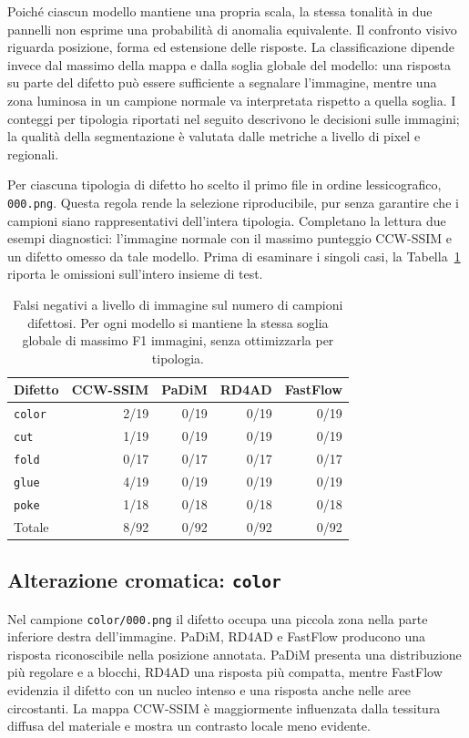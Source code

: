 Poiché ciascun modello mantiene una propria scala, la stessa tonalità in due pannelli non esprime una probabilità di anomalia equivalente. Il confronto visivo riguarda posizione, forma ed estensione delle risposte. La classificazione dipende invece dal massimo della mappa e dalla soglia globale del modello: una risposta su parte del difetto può essere sufficiente a segnalare l'immagine, mentre una zona luminosa in un campione normale va interpretata rispetto a quella soglia. I conteggi per tipologia riportati nel seguito descrivono le decisioni sulle immagini; la qualità della segmentazione è valutata dalle metriche a livello di pixel e regionali.

Per ciascuna tipologia di difetto ho scelto il primo file in ordine lessicografico, \texttt{000.png}. Questa regola rende la selezione riproducibile, pur senza garantire che i campioni siano rappresentativi dell'intera tipologia. Completano la lettura due esempi diagnostici: l'immagine normale con il massimo punteggio CCW-SSIM e un difetto omesso da tale modello. Prima di esaminare i singoli casi, la Tabella~\ref{tab:cap4-fn} riporta le omissioni sull'intero insieme di test.

\begin{table}[htbp]
\centering
\begin{tabular}{lrrrr}
\hline
Difetto & CCW-SSIM & PaDiM & RD4AD & FastFlow \\
\hline
\texttt{color} & 2/19 & 0/19 & 0/19 & 0/19 \\
\texttt{cut} & 1/19 & 0/19 & 0/19 & 0/19 \\
\texttt{fold} & 0/17 & 0/17 & 0/17 & 0/17 \\
\texttt{glue} & 4/19 & 0/19 & 0/19 & 0/19 \\
\texttt{poke} & 1/18 & 0/18 & 0/18 & 0/18 \\
\hline
Totale & 8/92 & 0/92 & 0/92 & 0/92 \\
\hline
\end{tabular}
\caption{Falsi negativi a livello di immagine sul numero di campioni difettosi. Per ogni modello si mantiene la stessa soglia globale di massimo F1 immagini, senza ottimizzarla per tipologia.}
\label{tab:cap4-fn}
\end{table}

\subsection{Alterazione cromatica: \texttt{color}}

Nel campione \texttt{color/000.png} il difetto occupa una piccola zona nella parte inferiore destra dell'immagine. PaDiM, RD4AD e FastFlow producono una risposta riconoscibile nella posizione annotata. PaDiM presenta una distribuzione più regolare e a blocchi, RD4AD una risposta più compatta, mentre FastFlow evidenzia il difetto con un nucleo intenso e una risposta anche nelle aree circostanti. La mappa CCW-SSIM è maggiormente influenzata dalla tessitura diffusa del materiale e mostra un contrasto locale meno evidente.

